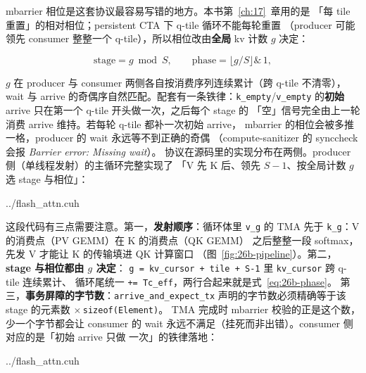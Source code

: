 mbarrier 相位是这套协议最容易写错的地方。本书第~\ref{ch:17}~章用的是
「每 tile 重置」的相对相位；persistent CTA 下 q-tile 循环不能每轮重置
（producer 可能领先 consumer 整整一个 q-tile），所以相位改由\textbf{全局}
kv 计数 $g$ 决定：

\begin{equation}\label{eq:26b-phase}
  \text{stage} = g \bmod S, \qquad \text{phase} = \lfloor g/S \rfloor \&\, 1 ,
\end{equation}

$g$ 在 producer 与 consumer 两侧各自按消费序列连续累计（跨 q-tile 不清零），
wait 与 arrive 的奇偶序自然匹配。配套有一条铁律：\texttt{k\_\allowbreak{}empty}/\texttt{v\_\allowbreak{}empty}
的\textbf{初始} arrive 只在第一个 q-tile 开头做一次，之后每个 stage 的
「空」信号完全由上一轮消费 arrive 维持。若每轮 q-tile 都补一次初始 arrive，
mbarrier 的相位会被多推一格，producer 的 wait 永远等不到正确的奇偶
（compute-sanitizer 的 synccheck 会报 \emph{Barrier error: Missing wait}）。
协议在源码里的实现分布在两侧。producer 侧（单线程发射）的主循环完整实现了
「V 先 K 后、领先 $S{-}1$、按全局计数 $g$ 选 stage 与相位」：

\begin{lstinputlisting}[linerange={3772-3802},firstnumber=auto,
  title={flash\_attn.cuh L3772-3802（producer 主循环：V-first-then-K 预取，$g$ 全局计数）}]{../flash_attn.cuh}
\end{lstinputlisting}

这段代码有三点需要注意。第一，\textbf{发射顺序}：循环体里 \texttt{v\_g} 的
TMA 先于 \texttt{k\_g}：V 的消费点（PV GEMM）在 K 的消费点（QK GEMM）
之后整整一段 softmax，先发 V 才能让 K 的传输填进 QK 计算窗口
（图~\ref{fig:26b-pipeline}）。第二，\textbf{stage 与相位都由 $g$ 决定}：
\texttt{g = kv\_cursor + tile + S-1} 里 \texttt{kv\_cursor} 跨 q-tile 连续累计、
循环尾统一 \texttt{+= Tc\_eff}，两行合起来就是式~\eqref{eq:26b-phase}。
第三，\textbf{事务屏障的字节数}：\texttt{arrive\_\allowbreak{}and\_\allowbreak{}expect\_\allowbreak{}tx}
声明的字节数必须精确等于该 stage 的元素数 $\times$\,\texttt{sizeof(Element)}。
TMA 完成时 mbarrier 校验的正是这个数，少一个字节都会让 consumer 的
wait 永远不满足（挂死而非出错）。consumer 侧对应的是「初始 arrive 只做
一次」的铁律落地：

\begin{lstinputlisting}[linerange={3866-3881},firstnumber=auto,
  title={flash\_attn.cuh L3866-3881（consumer：首轮一次性标记全部 stage 为 empty）}]{../flash_attn.cuh}
\end{lstinputlisting}

